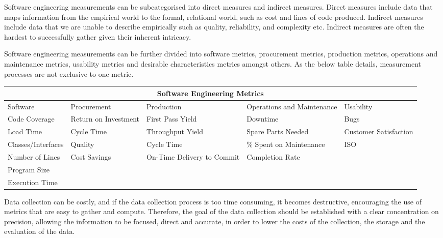 \documentclass{article}
\begin{document}
Software engineering measurements can be subcategorised into direct measures and indirect measures. Direct measures include data that maps information from the empirical world to the formal, relational world\cite{direct}, such as cost and lines of code produced. Indirect measures include data that we are unable to describe empirically such as quality, reliability, and complexity etc. Indirect measures are often the hardest to successfully gather given their inherent intricacy. \newline

Software engineering measurements can be further divided into software metrics, procurement metrics, production metrics, operations and maintenance metrics, usability metrics and desirable characteristics metrics amongst others. As the below table details, measurement processes are not exclusive to one metric. \newline

\hspace*{-2cm}\begin{tabular}{ |p{2.5cm}||p{2.5cm}|p{2.5cm}|p{2.5cm}|p{2.5cm}| }
\hline
\multicolumn{5}{|c|}{Software Engineering Metrics} \\
\hline
Software & Procurement & Production & Operations and Maintenance & Usability \\
\hline
Code Coverage & Return on Investment \newline & First Pass Yield & Downtime & Bugs \newline \\
Load Time & Cycle Time & Throughput Yield \newline & Spare Parts Needed \newline & Customer Satisfaction \\
Classes/Interfaces & Quality & Cycle Time & \% Spent on Maintenance \newline & ISO \\
Number of Lines & Cost Savings & On-Time Delivery to Commit & Completion Rate & \\
Program Size & & & & \\
Execution Time & & & & \\
\hline
\end{tabular} \newline \newline

Data collection can be costly, and if the data collection process is too time consuming, it becomes destructive, encouraging the use of metrics that are easy to gather and compute. Therefore, the goal of the data collection should be established with a clear concentration on precision, allowing the information to be focused, direct and accurate, in order to lower the costs of the collection, the storage and the evaluation of the data. 
\end{document}
